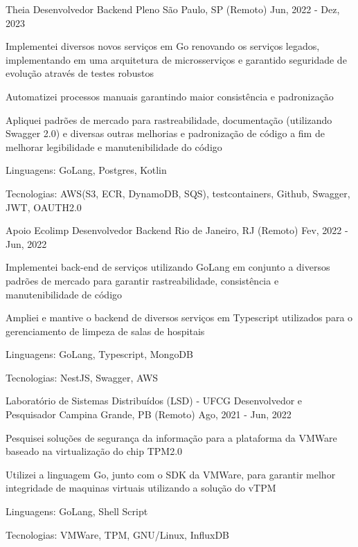 
\begin{cventries}
  \cventry
  {Theia} %
  {Desenvolvedor Backend Pleno} %
  {São Paulo, SP (Remoto)} %
  {Jun, 2022 - Dez, 2023} %
  {
    \begin{cvitems} %
      \item {Implementei diversos novos serviços em Go renovando os serviços legados, implementando em uma arquitetura de microsserviços e garantido seguridade de evolução através de testes robustos}
      \item {Automatizei processos manuais garantindo maior consistência e padronização}
      \item {Apliquei padrões de mercado para rastreabilidade, documentação (utilizando Swagger 2.0) e diversas outras melhorias e padronização de código a fim de melhorar legibilidade e manutenibilidade do código}
      \item {Linguagens: GoLang, Postgres, Kotlin}
      \item {Tecnologias: AWS(S3, ECR, DynamoDB, SQS), testcontainers, Github, Swagger, JWT, OAUTH2.0}
    \end{cvitems}
  }

  \cventry
  {Apoio Ecolimp} %
  {Desenvolvedor Backend} %
  {Rio de Janeiro, RJ (Remoto)} %
  {Fev, 2022 - Jun, 2022} %
  {
    \begin{cvitems} %
      \item {Implementei back-end de serviços utilizando GoLang em conjunto a diversos padrões de mercado para garantir rastreabilidade, consistência e manutenibilidade de código}
      \item {Ampliei e mantive o backend de diversos serviços em Typescript utilizados para o gerenciamento de limpeza de salas de hospitais}
      \item {Linguagens: GoLang, Typescript, MongoDB}
      \item {Tecnologias: NestJS, Swagger, AWS}
    \end{cvitems}
  }

  \cventry
  {Laboratório de Sistemas Distribuídos (LSD) - UFCG} %
  {Desenvolvedor e Pesquisador} %
  {Campina Grande, PB (Remoto)} %
  {Ago, 2021 - Jun, 2022} %
  {
    \begin{cvitems} %
      \item {Pesquisei soluções de segurança da informação para a plataforma da VMWare baseado na virtualização do chip TPM2.0}
      \item {Utilizei a linguagem Go, junto com o SDK da VMWare, para garantir melhor integridade de maquinas virtuais utilizando a solução do vTPM}
      \item {Linguagens: GoLang, Shell Script}
      \item {Tecnologias: VMWare, TPM, GNU/Linux, InfluxDB}
    \end{cvitems}
  }


\end{cventries}
